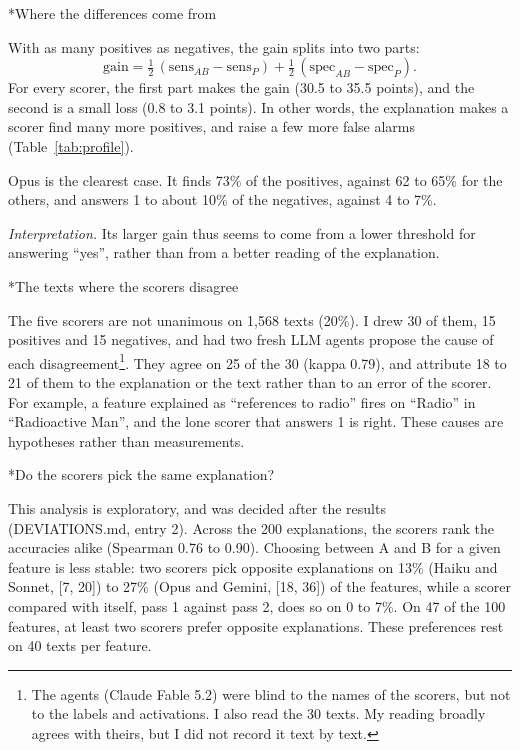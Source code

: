 \documentclass[10pt]{article}
\makeatletter
\renewcommand\subsection{\@startsection{subsection}{2}{\z@}{-1.3ex}{0.4ex}{\normalfont\normalsize\bfseries}}
\makeatother
\begin{document}
\subsection*{Where the differences come from}

With as many positives as negatives, the gain splits into two parts:
\[
\text{gain} = \tfrac12\,(\text{sens}_{AB}-\text{sens}_P) + \tfrac12\,(\text{spec}_{AB}-\text{spec}_P).
\]
For every scorer, the first part makes the gain (30.5 to 35.5 points), and the second is
a small loss (0.8 to 3.1 points). In other words, the explanation makes a scorer find many
more positives, and raise a few more false alarms (Table~\ref{tab:profile}).

Opus is the clearest case. It finds 73\% of the positives, against 62 to 65\% for the
others, and answers 1 to about 10\% of the negatives, against 4 to 7\%.

\textit{Interpretation.} Its larger
gain thus seems to come from a lower threshold for answering ``yes'', rather than from a
better reading of the explanation.

\subsection*{The texts where the scorers disagree}

The five scorers are not unanimous on 1,568 texts (20\%). I drew 30 of them, 15
positives and 15 negatives, and had two fresh LLM agents propose the cause of each
disagreement\footnote{The agents (Claude Fable 5.2) were blind to the names of the
scorers, but not to the labels and activations. I also read the 30 texts. My reading
broadly agrees with theirs, but I did not record it text by text.}. They agree on 25
of the 30 (kappa 0.79), and attribute 18 to 21 of them to the explanation or the text
rather than to an error of the scorer. For example, a feature explained as ``references
to radio'' fires on ``Radio'' in ``Radioactive Man'', and the lone scorer that answers 1
is right. These causes are hypotheses rather than measurements.

\subsection*{Do the scorers pick the same explanation?}

This analysis is exploratory, and was decided after the results (DEVIATIONS.md, entry 2).
Across the 200 explanations, the scorers rank the accuracies alike (Spearman 0.76 to
0.90). Choosing between A and B for a given feature is less stable: two scorers pick
opposite explanations on 13\% (Haiku and Sonnet, [7, 20]) to 27\% (Opus and Gemini, [18,
36]) of the features, while a scorer compared with itself, pass 1 against pass 2, does so
on 0 to 7\%. On 47 of the 100 features, at least two scorers prefer opposite
explanations. These preferences rest on 40 texts per feature.
\end{document}
